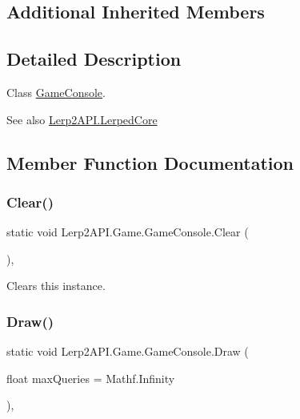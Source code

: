 \subsection*{Additional Inherited Members}


\subsection{Detailed Description}
Class \hyperlink{class_lerp2_a_p_i_1_1_game_1_1_game_console}{Game\+Console}. 

\begin{DoxySeeAlso}{See also}
\hyperlink{class_lerp2_a_p_i_1_1_lerped_core}{Lerp2\+A\+P\+I.\+Lerped\+Core}


\end{DoxySeeAlso}


\subsection{Member Function Documentation}
\mbox{\label{class_lerp2_a_p_i_1_1_game_1_1_game_console_acf996b54c85610e97ecc7aa094860e8b}} 
\subsubsection{\texorpdfstring{Clear()}{Clear()}}
{\footnotesize\ttfamily static void Lerp2\+A\+P\+I.\+Game.\+Game\+Console.\+Clear (\begin{DoxyParamCaption}{ }\end{DoxyParamCaption})\hspace{0.3cm}{\ttfamily [inline]}, {\ttfamily [static]}}



Clears this instance. 

\mbox{\label{class_lerp2_a_p_i_1_1_game_1_1_game_console_a1cb8971ac1e38f65234bea0d17429acb}} 
\subsubsection{\texorpdfstring{Draw()}{Draw()}}
{\footnotesize\ttfamily static void Lerp2\+A\+P\+I.\+Game.\+Game\+Console.\+Draw (\begin{DoxyParamCaption}\item[{float}]{max\+Queries = {\ttfamily Mathf.Infinity} }\end{DoxyParamCaption})\hspace{0.3cm}{\ttfamily [inline]}, {\ttfamily [static]}}



